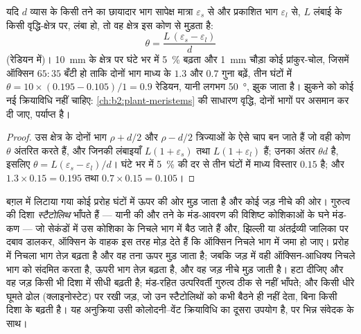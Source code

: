 \begin{theorem}[कोई तना कितना झुकता है]\label{thm:b2:plant-plasticity:bend}
यदि $d$ व्यास के किसी तने का छायादार भाग सापेक्ष मात्रा
$\varepsilon_s$ से और प्रकाशित भाग $\varepsilon_l$ से, $L$ लंबाई के किसी
वृद्धि-क्षेत्र पर, लंबा हो, तो वह क्षेत्र इस कोण से मुड़ता है:
\[
\theta = \frac{L\,(\varepsilon_s - \varepsilon_l)}{d}
\]
(रेडियन में)। \qty{10}{mm} के क्षेत्र पर घंटे भर में \qty{5}{\%} बढ़ता
और \qty{1}{mm} चौड़ा कोई प्रांकुर-चोल, जिसमें ऑक्सिन
$65 : 35$ बँटी हो ताकि दोनों भाग माध्य के $1.3$ और $0.7$ गुना बढ़ें,
तीन घंटों में $\theta = 10\times(0.195 - 0.105)/1 =
0.9$ रेडियन, यानी लगभग \qty{50}{\degree}, झुक जाता है। झुकने को कोई नई
क्रियाविधि नहीं चाहिए: \cref{ch:b2:plant-meristems} की साधारण वृद्धि,
दोनों भागों पर असमान कर दी जाए, पर्याप्त है।
\end{theorem}
\begin{proof}
उस क्षेत्र के दोनों भाग $\rho + d/2$ और $\rho - d/2$ त्रिज्याओं के ऐसे
चाप बन जाते हैं जो वही कोण $\theta$ अंतरित करते हैं, और जिनकी लंबाइयाँ $L(1 +
\varepsilon_s)$ तथा $L(1 + \varepsilon_l)$ हैं; उनका अंतर
$\theta d$ है, इसलिए $\theta = L(\varepsilon_s - \varepsilon_l)/d$। घंटे
भर में \qty{5}{\%} की दर से तीन घंटों में माध्य विस्तार $0.15$ है;
और $1.3\times 0.15 = 0.195$ तथा $0.7\times 0.15 = 0.105$।
\end{proof}

\begin{proposition}[गुरुत्वानुवर्तन]\label{prop:b2:plant-plasticity:gravitropism}
बग़ल में लिटाया गया कोई प्ररोह घंटों में ऊपर की ओर मुड़ जाता है और कोई
जड़ नीचे की ओर। गुरुत्व की दिशा \emph{स्टैटोलिथ} भाँपते हैं ---
यानी  की और तने के मंड-आवरण की विशिष्ट कोशिकाओं के
घने मंड-कण --- जो सेकंडों में उस कोशिका के निचले भाग में बैठ जाते हैं
और, झिल्ली या अंतर्द्रव्यी जालिका पर दबाव डालकर, ऑक्सिन के वाहक इस तरह
मोड़ देते हैं कि ऑक्सिन निचले भाग में जमा हो जाए। प्ररोह में निचला भाग
तेज़ बढ़ता है और वह तना ऊपर मुड़ जाता है; जबकि जड़ में वही ऑक्सिन-आधिक्य
निचले भाग को संदमित करता है, ऊपरी भाग तेज़ बढ़ता है, और वह जड़ नीचे मुड़
जाती है।  हटा दीजिए और वह जड़ किसी भी दिशा में सीधी बढ़ती है;
मंड-रहित उत्परिवर्ती गुरुत्व ठीक से नहीं भाँपते; और किसी धीरे घूमते ढोल
(क्लाइनोस्टेट) पर रखी जड़, जो उन स्टैटोलिथों को कभी बैठने ही नहीं देता,
बिना किसी दिशा के बढ़ती है। यह अनुक्रिया उसी
कोलोदनी--वेंट क्रियाविधि का दूसरा उपयोग है, पर भिन्न संवेदक के साथ।
\end{proposition}

